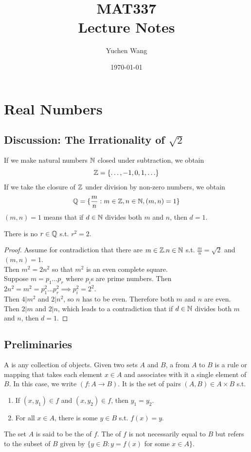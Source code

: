\documentclass[11pt]{article}
\title{MAT337\\ Lecture Notes}
\author{Yuchen Wang}
\date{\today}
\begin{document}
    \maketitle
    \tableofcontents
    \newpage

\section{Real Numbers}
\subsection{Discussion: The Irrationality of $\sqrt{2}$}
If we make natural numbers $\mathbb{N}$ closed under subtraction, we obtain 
$$\mathbb{Z} = \{ \hdots, -1, 0, 1, \hdots \}$$
If we take the closure of $\mathbb{Z}$ under division by non-zero numbers, we obtain
$$\mathbb{Q} = \{\frac{m}{n}: m \in \mathbb{Z}, n \in \mathbb{N}, (m,n) = 1 \}$$
\remark
$(m, n) = 1$ means that if $d \in \mathbb{N}$ divides both $m$ and $n$, then $d = 1$.

\theorem
There is no $r \in \mathbb{Q}$ s.t. $r^2 = 2$.

\begin{proof}
	Assume for contradiction that there are $m \in \mathbb{Z}. n \in \mathbb{N}$ s.t. $\frac{m}{n} = \sqrt{2}$ and $(m,n) = 1$. \\
	Then $m^2 = 2n^2$ so that $m^2$ is an even complete square. \\
	Suppose $m = p_1 \hdots p_r$ where $p_i$s are prime numbers. Then $2n^2 = m^2 = p_1^2 \hdots p_r^2 \implies p_i^2 = 2^2$. \\
	Then $4 | m^2$ and $2|n^2$, so $n$ has to be even. Therefore both $m$ and $n$ are even. \\
	Then $2 | m$ and $2|n$, which leads to a contradiction that if $d \in \mathbb{N}$ divides both $m$ and $n$, then $d = 1$.
\end{proof}

\subsection{Preliminaries}
A  is any collection of objects.
Given two sets $A$ and $B$, a  from $A$ to $B$ is a rule or mapping that takes each element $x \in A$ and associates with it a single element of $B$. In this case, we write $(f: A \rightarrow B)$. It is the set of pairs $(A, B) \in A \times B$ s.t.
\begin{enumerate}
	\item If $(x,y_1) \in f$ and $(x,y_2) \in f$, then $y_1 = y_2$.
	\item For all $x \in A$, there is some $y \in B$ s.t. $f(x) = y$.
\end{enumerate}
The set $A$ is said to be the  of $f$. The  of $f$ is not necessarily equal to $B$ but refers to the subset of $B$ given by $\{ y \in B: y = f(x)$ for some $x \in A \}$.
\end{document}
